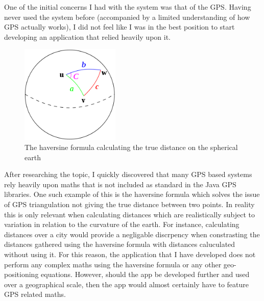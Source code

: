 \documentclass[12pt]{article} %
\begin{document}
One of the initial concerns I had with the system was that of the GPS. Having never used the system
before (accompanied by a limited understanding of how GPS actually works), I did not feel like I
was in the best position to start developing an application that relied heavily upon it. \\

\begin{figure} %
 \begin{center}
    \includegraphics[width=0.42\textwidth]{haversine}
  \end{center}
  \parbox{0.45\textwidth}{\caption{The haversine formula calculating the true distance on the
spherical earth}}
\end{figure}

After researching the topic, I quickly discovered that many GPS based systems rely heavily upon
maths that is not included as standard in the Java GPS libraries. One such example of this is the
haversine formula which solves the issue of GPS triangulation not giving the true distance between
two points. In reality this is only relevant when calculating distances which are realistically
subject to variation in relation to the curvature of the earth. For instance, calculating distances
over a city would provide a negligable discrpency when constrasting the distances gathered using
the haversine formula with distances caluculated without using it. For this reason, the application
that I have developed does not perform any complex maths using the haversine formula or any other
geo-positioning equations. However, should the app be developed further and used over a
geographical scale, then the app would almost certainly have to feature GPS related maths.
\end{document}
